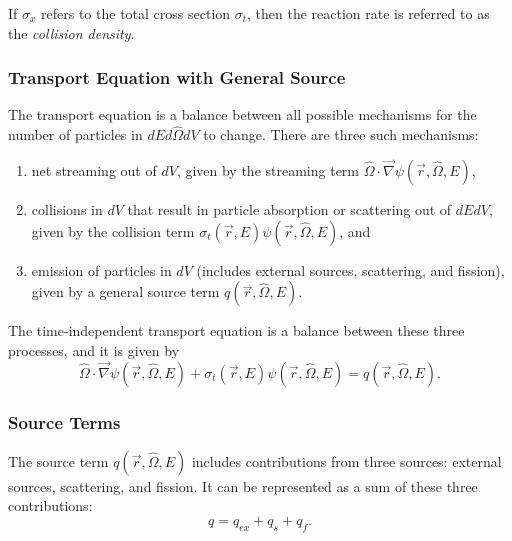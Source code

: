 If $\sigma_x$ refers to the total cross section $\sigma_t$, then the reaction rate is referred to as the \textit{collision density}.

\subsubsection{Transport Equation with General Source}
\label{sec:bg:rt:te:te}

The transport equation is a balance between all possible mechanisms for the number of particles in $dEd\hat{\Omega}dV$ to change.
There are three such mechanisms:
\begin{enumerate}
  \item net streaming out of $dV$, given by the streaming term $\hat{\Omega}\cdot\vec{\nabla}\psi\left(\vec{r},\hat{\Omega},E\right)$,
  \item collisions in $dV$ that result in particle absorption or scattering out of $dEdV$, given by the collision term $\sigma_t\left(\vec{r},E\right)\psi\left(\vec{r},\hat{\Omega},E\right)$, and
  \item emission of particles in $dV$ (includes external sources, scattering, and fission), given by a general source term $q\left(\vec{r},\hat{\Omega},E\right)$.
\end{enumerate}

The time-independent transport equation is a balance between these three processes, and it is given by
\begin{equation}\label{eq:bg:rt:transport-totsrc}
  \hat{\Omega}\cdot\vec{\nabla}\psi\left(\vec{r},\hat{\Omega},E\right) +
  \sigma_t\left(\vec{r},E\right)\psi\left(\vec{r},\hat{\Omega},E\right) =
  q\left(\vec{r},\hat{\Omega},E\right).
\end{equation}

\subsubsection{Source Terms}
\label{sec:bg:rt:te:st}

The source term $q\left(\vec{r},\hat{\Omega},E\right)$ includes contributions from three sources: external sources, scattering, and fission.
It can be represented as a sum of these three contributions:
\begin{equation}\label{eq:bg:rt:source}
  q = q_{ex} + q_s + q_f.
\end{equation}

